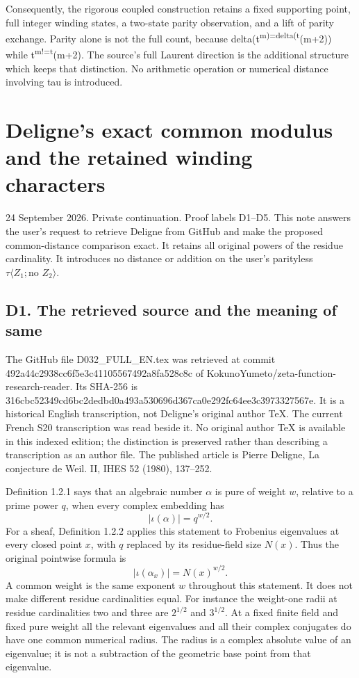 \documentclass[
  11pt,
]{article}
\begin{document}
Consequently, the rigorous coupled construction retains a fixed
supporting point, full integer winding states, a two-state parity
observation, and a lift of parity exchange. Parity alone is not the full
count, because delta(t\textsuperscript{m)=delta(t}(m+2)) while
t\textsuperscript{m!=t}(m+2). The source's full Laurent direction is the
additional structure which keeps that distinction. No arithmetic
operation or numerical distance involving tau is introduced.

\section{Deligne's exact common modulus and the retained winding
characters}\label{delignes-exact-common-modulus-and-the-retained-winding-characters}

24 September 2026. Private continuation. Proof labels D1--D5. This note
answers the user's request to retrieve Deligne from GitHub and make the
proposed common-distance comparison exact. It retains all original
powers of the residue cardinality. It introduces no distance or addition
on the user's parityless \(\tau\langle Z_1;\text{no }Z_2\rangle\).

\subsection{D1. The retrieved source and the meaning of
same}\label{d1.-the-retrieved-source-and-the-meaning-of-same}

The GitHub file D032\_FULL\_EN.tex was retrieved at commit
492a44c2938cc6f5e3c41105567492a8fa528c8c of
KokunoYumeto/zeta-function-research-reader. Its SHA-256 is
316cbc52349cd6bc2dedbd0a493a530696d367ca0e292fc64ee3c3973327567e. It is
a historical English transcription, not Deligne's original author TeX.
The current French S20 transcription was read beside it. No original
author TeX is available in this indexed edition; the distinction is
preserved rather than describing a transcription as an author file. The
published article is Pierre Deligne, La conjecture de Weil. II, IHES 52
(1980), 137--252.

Definition 1.2.1 says that an algebraic number \(\alpha\) is pure of
weight \(w\), relative to a prime power \(q\), when every complex
embedding has \[
|\iota(\alpha)|=q^{w/2}.
\] For a sheaf, Definition 1.2.2 applies this statement to Frobenius
eigenvalues at every closed point \(x\), with \(q\) replaced by its
residue-field size \(N(x)\). Thus the original pointwise formula is \[
|\iota(\alpha_x)|=N(x)^{w/2}.
\] A common weight is the same exponent \(w\) throughout this statement.
It does not make different residue cardinalities equal. For instance the
weight-one radii at residue cardinalities two and three are \(2^{1/2}\)
and \(3^{1/2}\). At a fixed finite field and fixed pure weight all the
relevant eigenvalues and all their complex conjugates do have one common
numerical radius. The radius is a complex absolute value of an
eigenvalue; it is not a subtraction of the geometric base point from
that eigenvalue.
\end{document}
